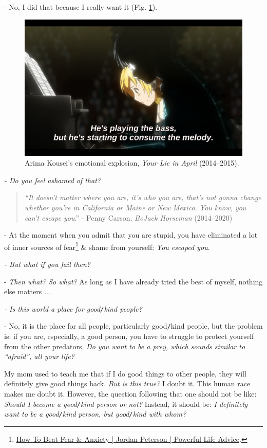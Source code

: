 \documentclass[12pt,oneside]{book}
\begin{document}
- No, I did that because I really want it (Fig. \ref{fig4}).
\begin{figure}[H]
	\centering
	\includegraphics[width = 12cm]{Arima_Kousei_emotional_explosion}
	\caption{{\sf Arima Kousei}'s emotional explosion, {\it Your Lie in April} (2014--2015).}
	\label{fig4}
\end{figure}

{\it - Do you feel ashamed of that?}

\begin{quote}
	{\it``It doesn't matter where you are, it's who you are, that's not gonna change whether you're in California or Maine or New Mexico. You know, you can't escape you}.'' - Penny Carson, {\it BoJack Horseman} (2014--2020)
\end{quote}

- At the moment when you admit that you are stupid, you have eliminated a lot of inner sources of fear\footnote{\href{https://www.youtube.com/watch?v=bb9g9mtDHZo}{How To Beat Fear \& Anxiety | Jordan Peterson | Powerful Life Advice}.} \& shame from yourself: {\it You escaped you}.

{\it - But what if you fail then?}

- {\it Then what? So what?} As long as I have already tried the best of myself, nothing else matters $\ldots$

{\it - Is this world a place for good{\tt/}kind people?}

- No, it is the place for all people, particularly good{\tt/}kind people, but the problem is: if you are, especially, a good person, you have to struggle to protect yourself from the other predators. {\it Do you want to be a prey, which sounds similar to ``afraid'', all your life?} 

My mom used to teach me that if I do good things to other people, they will definitely give good things back. {\it But is this true?} I doubt it. This human race makes me doubt it. However, the question following that one should not be like: {\it Should I become a good{\tt/}kind person or not?} Instead, it should be: {\it I definitely want to be a good{\tt/}kind person, but good{\tt/}kind with whom?}
\end{document}
